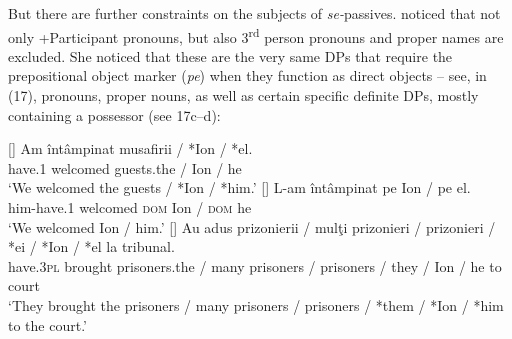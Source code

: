 \documentclass[output=paper]{langsci/langscibook}
\begin{document}
But there are further constraints on the subjects of \textit{se-}passives. \citet{Cornilescu1998} noticed that not only +Participant pronouns, but also 3\textsuperscript{rd} person pronouns and proper names are excluded. She noticed that these are the very same DPs that require the prepositional object marker (\textit{pe}) when they function as direct objects – see, in (17), pronouns, proper nouns, as well as certain specific definite DPs, mostly containing a possessor (see 17c--d):

\ea%
    \label{ex:giurgea:17}
    \begin{xlista}[c{'}{'}.]
    []{
    \gll Am     întâmpinat musafirii / *Ion / *el.\\
         have.\textsc{1} welcomed guests.the / Ion / he   \\
    \glt ‘We welcomed  the guests / *Ion / *him.’}
    []{
    \gll L-am          întâmpinat pe   Ion  / pe    el. \\
                him-have.\textsc{1} welcomed \textsc{dom} Ion / \textsc{dom} he\\
    \glt        ‘We welcomed  Ion / him.’}
    []{
    \gll Au          adus     prizonierii    / mulţi prizonieri  / prizonieri / *ei / *Ion / *el la tribunal.\\
         have.\textsc{3pl} brought prisoners.the / many prisoners / prisoners / they / Ion / he    to court\\
    \glt ‘They brought the prisoners / many prisoners / prisoners / *them / *Ion / *him to the court.’}

\end{xlista}
\end{document}
